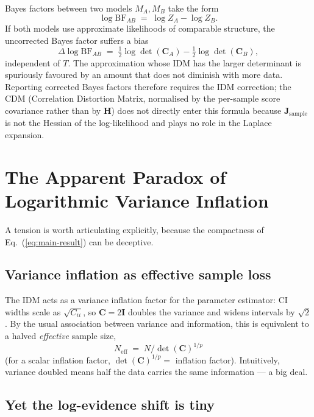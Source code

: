 \documentclass[11pt]{article}
\begin{document}
Bayes factors between two models $M_A, M_B$ take the form
\begin{equation}
\log\mathrm{BF}_{AB}
\;=\;
\log Z_A - \log Z_B.
\end{equation}
If both models use approximate likelihoods of comparable structure, the uncorrected Bayes factor suffers a bias
\begin{equation}
\Delta \log\mathrm{BF}_{AB}
\;=\;
\tfrac{1}{2}\log\det(\mathbf C_A)
-
\tfrac{1}{2}\log\det(\mathbf C_B),
\end{equation}
independent of $T$. The approximation whose IDM has the larger determinant is spuriously favoured by an amount that does not diminish with more data. Reporting corrected Bayes factors therefore requires the IDM correction; the CDM (Correlation Distortion Matrix, normalised by the per-sample score covariance rather than by $\mathbf H$) does not directly enter this formula because $\mathbf J_{\mathrm{sample}}$ is not the Hessian of the log-likelihood and plays no role in the Laplace expansion.

\section{The Apparent Paradox of Logarithmic Variance Inflation}

A tension is worth articulating explicitly, because the compactness of Eq.~(\ref{eq:main-result}) can be deceptive.

\subsection{Variance inflation as effective sample loss}

The IDM acts as a variance inflation factor for the parameter estimator: CI widths scale as $\sqrt{C_{ii}}$, so $\mathbf C = 2\mathbf I$ doubles the variance and widens intervals by $\sqrt{2}$. By the usual association between variance and information, this is equivalent to a halved \emph{effective} sample size,
\begin{equation}
N_{\mathrm{eff}} \;=\; N / \det(\mathbf C)^{1/p}
\end{equation}
(for a scalar inflation factor, $\det(\mathbf C)^{1/p} = $ inflation factor). Intuitively, variance doubled means half the data carries the same information --- a big deal.

\subsection{Yet the log-evidence shift is tiny}
\end{document}
